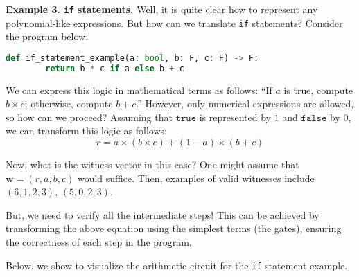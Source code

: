 \documentclass[../lecture-notes.tex]{subfiles}
\begin{document}
\textbf{Example 3. \texttt{if} statements.} Well, it is quite clear how to represent any polynomial-like expressions. But how can we translate \texttt{if} statements? Consider the program below:

\begin{lstlisting}[language=Python,numbers=none]
    def if_statement_example(a: bool, b: F, c: F) -> F:
        return b * c if a else b + c
\end{lstlisting}

We can express this logic in mathematical terms as follows: ``If $a$ is true, compute 
$b \times c$; otherwise, compute $b + c$.'' However, only numerical expressions are allowed, so how can we proceed? Assuming that
$\texttt{true}$ is represented by $1$ and $\texttt{false}$ by $0$, we can transform this logic as follows:
\begin{equation*}
    r = a \times (b \times c) + (1 - a) \times (b + c)    
\end{equation*}

Now, what is the witness vector in this case? One might assume that $\mathbf{w} = (r, a, b, c)$ would suffice. Then, examples of valid witnesses include $(6, 1, 2, 3)$, $(5, 0, 2, 3)$.

But, we need to verify all the intermediate steps! This can be achieved by transforming the above
equation using the simplest terms (the gates), ensuring the correctness of each step in the program.

Below, we show to visualize the arithmetic circuit for the \texttt{if} statement example.
\end{document}
